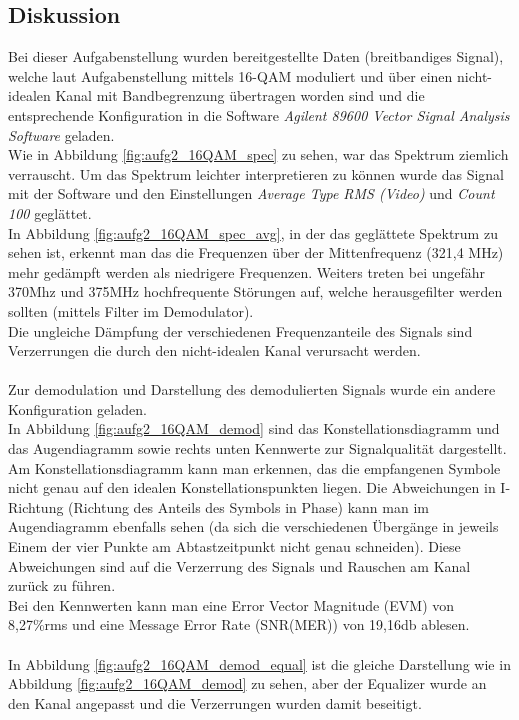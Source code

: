 \documentclass[12pt,a4paper,ngerman]{article}
\begin{document}
\subsection{Diskussion}
Bei dieser Aufgabenstellung wurden bereitgestellte Daten (breitbandiges Signal), welche laut Aufgabenstellung mittels 16-QAM moduliert und über einen nicht-idealen Kanal mit Bandbegrenzung übertragen worden sind und die entsprechende Konfiguration in die Software \emph{Agilent 89600 Vector Signal Analysis Software} geladen.\\
Wie in Abbildung \ref{fig:aufg2_16QAM_spec} zu sehen, war das Spektrum ziemlich verrauscht. Um das Spektrum leichter interpretieren zu können wurde das Signal mit der Software und den Einstellungen \emph{Average Type RMS (Video)} und \emph{Count 100} \cite[23]{skript} geglättet.\\
In Abbildung \ref{fig:aufg2_16QAM_spec_avg}, in der das geglättete Spektrum zu sehen ist, erkennt man das die Frequenzen über der Mittenfrequenz (321,4 MHz) mehr gedämpft werden als niedrigere Frequenzen. Weiters treten bei ungefähr 370Mhz und 375MHz hochfrequente Störungen auf, welche herausgefilter werden sollten (mittels Filter im Demodulator).\\
Die ungleiche Dämpfung der verschiedenen Frequenzanteile des Signals sind Verzerrungen die durch den nicht-idealen Kanal verursacht werden.\\
\\
Zur demodulation und Darstellung des demodulierten Signals wurde ein andere Konfiguration geladen.\\
In Abbildung \ref{fig:aufg2_16QAM_demod} sind das Konstellationsdiagramm und das Augendiagramm sowie rechts unten Kennwerte zur Signalqualität dargestellt.
Am Konstellationsdiagramm kann man erkennen, das die empfangenen Symbole nicht genau auf den idealen Konstellationspunkten liegen. Die Abweichungen in I-Richtung (Richtung des Anteils des Symbols in Phase) kann man im Augendiagramm ebenfalls sehen (da sich die verschiedenen Übergänge in jeweils Einem der vier Punkte am Abtastzeitpunkt nicht genau schneiden). Diese Abweichungen sind auf die Verzerrung des Signals und Rauschen am Kanal zurück zu führen.\\
Bei den Kennwerten kann man eine Error Vector Magnitude (EVM) von 8,27\%rms und eine Message Error Rate (SNR(MER)) von 19,16db ablesen.\\
\\
In Abbildung \ref{fig:aufg2_16QAM_demod_equal} ist die gleiche Darstellung wie in Abbildung \ref{fig:aufg2_16QAM_demod} zu sehen, aber der Equalizer wurde an den Kanal angepasst und die Verzerrungen wurden damit beseitigt.\\
\end{document}
